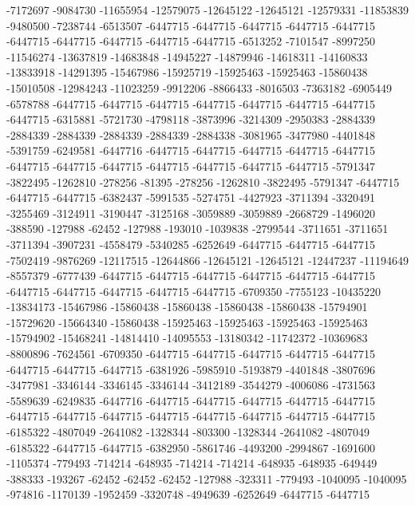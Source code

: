 -7172697 -9084730 -11655954 -12579075 -12645122 -12645121 -12579331 -11853839 -9480500 -7238744 -6513507 -6447715 -6447715 -6447715 -6447715 -6447715 -6447715 -6447715 -6447715 -6447715 -6447715 -6513252 -7101547 -8997250 -11546274 -13637819 -14683848 -14945227 -14879946 -14618311 -14160833 -13833918 -14291395 -15467986 -15925719 -15925463 -15925463 -15860438 -15010508 -12984243 -11023259 -9912206 -8866433 -8016503 -7363182 -6905449 -6578788 -6447715 -6447715 -6447715 -6447715 -6447715 -6447715 -6447715 -6447715 -6315881 -5721730 -4798118 -3873996 -3214309 -2950383 -2884339 -2884339 -2884339 -2884339 -2884339 -2884338 -3081965 -3477980 -4401848 -5391759 -6249581 -6447716 -6447715 -6447715 -6447715 -6447715 -6447715 -6447715 -6447715 -6447715 -6447715 -6447715 -6447715 -6447715 -5791347 -3822495 -1262810 -278256 -81395 -278256 -1262810 -3822495 -5791347 -6447715 -6447715 -6447715 -6382437 -5991535 -5274751 -4427923 -3711394 -3320491 -3255469 -3124911 -3190447 -3125168 -3059889 -3059889 -2668729 -1496020 -388590 -127988 -62452 -127988 -193010 -1039838 -2799544 -3711651 -3711651 -3711394 -3907231 -4558479 -5340285 -6252649 -6447715 -6447715 -6447715
-7502419 -9876269 -12117515 -12644866 -12645121 -12645121 -12447237 -11194649 -8557379 -6777439 -6447715 -6447715 -6447715 -6447715 -6447715 -6447715 -6447715 -6447715 -6447715 -6447715 -6447715 -6709350 -7755123 -10435220 -13834173 -15467986 -15860438 -15860438 -15860438 -15860438 -15794901 -15729620 -15664340 -15860438 -15925463 -15925463 -15925463 -15925463 -15794902 -15468241 -14814410 -14095553 -13180342 -11742372 -10369683 -8800896 -7624561 -6709350 -6447715 -6447715 -6447715 -6447715 -6447715 -6447715 -6447715 -6447715 -6381926 -5985910 -5193879 -4401848 -3807696 -3477981 -3346144 -3346145 -3346144 -3412189 -3544279 -4006086 -4731563 -5589639 -6249835 -6447716 -6447715 -6447715 -6447715 -6447715 -6447715 -6447715 -6447715 -6447715 -6447715 -6447715 -6447715 -6447715 -6447715 -6185322 -4807049 -2641082 -1328344 -803300 -1328344 -2641082 -4807049 -6185322 -6447715 -6447715 -6382950 -5861746 -4493200 -2994867 -1691600 -1105374 -779493 -714214 -648935 -714214 -714214 -648935 -648935 -649449 -388333 -193267 -62452 -62452 -62452 -127988 -323311 -779493 -1040095 -1040095 -974816 -1170139 -1952459 -3320748 -4949639 -6252649 -6447715 -6447715
